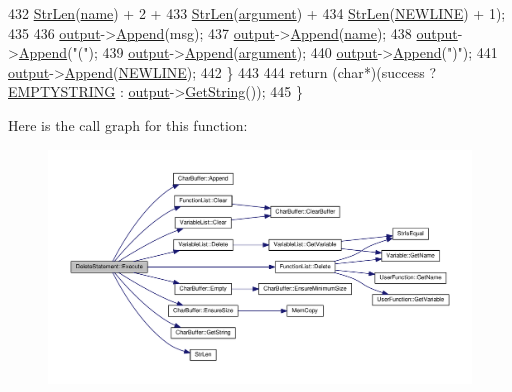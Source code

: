 \begin{DoxyCode}
432             \hyperlink{clib_8h_a67ec56eb98b49515d35005a5b3bf9a32}{StrLen}(\hyperlink{classDeleteStatement_aec9706bae02a354afec8f639e283e5b9}{name}) + 2 +
433             \hyperlink{clib_8h_a67ec56eb98b49515d35005a5b3bf9a32}{StrLen}(\hyperlink{classDeleteStatement_a0fe7f24dcfd05e0f7f449e19aaabee2d}{argument}) +
434             \hyperlink{clib_8h_a67ec56eb98b49515d35005a5b3bf9a32}{StrLen}(\hyperlink{platform_8h_a806511f4930171733227c99101dc0606}{NEWLINE}) + 1);
435 
436         \hyperlink{classSyntaxNode_a1180628cbe3fce43930cee0df5a9ce5c}{output}->\hyperlink{classCharBuffer_a045b38735f7b3007c1b98d3d7b7feafe}{Append}(msg);
437         \hyperlink{classSyntaxNode_a1180628cbe3fce43930cee0df5a9ce5c}{output}->\hyperlink{classCharBuffer_a045b38735f7b3007c1b98d3d7b7feafe}{Append}(\hyperlink{classDeleteStatement_aec9706bae02a354afec8f639e283e5b9}{name});
438         \hyperlink{classSyntaxNode_a1180628cbe3fce43930cee0df5a9ce5c}{output}->\hyperlink{classCharBuffer_a045b38735f7b3007c1b98d3d7b7feafe}{Append}(\textcolor{stringliteral}{"("});
439         \hyperlink{classSyntaxNode_a1180628cbe3fce43930cee0df5a9ce5c}{output}->\hyperlink{classCharBuffer_a045b38735f7b3007c1b98d3d7b7feafe}{Append}(\hyperlink{classDeleteStatement_a0fe7f24dcfd05e0f7f449e19aaabee2d}{argument});
440         \hyperlink{classSyntaxNode_a1180628cbe3fce43930cee0df5a9ce5c}{output}->\hyperlink{classCharBuffer_a045b38735f7b3007c1b98d3d7b7feafe}{Append}(\textcolor{stringliteral}{")"});
441         \hyperlink{classSyntaxNode_a1180628cbe3fce43930cee0df5a9ce5c}{output}->\hyperlink{classCharBuffer_a045b38735f7b3007c1b98d3d7b7feafe}{Append}(\hyperlink{platform_8h_a806511f4930171733227c99101dc0606}{NEWLINE});
442     \}
443 
444     \textcolor{keywordflow}{return} (\textcolor{keywordtype}{char}*)(success ? \hyperlink{platform_8h_a79ff1b9ff232b38c8b5600659e6bc7c2}{EMPTYSTRING} : \hyperlink{classSyntaxNode_a1180628cbe3fce43930cee0df5a9ce5c}{output}->\hyperlink{classCharBuffer_a7dfd3feaaf80f318ba44efe15b1ec44b}{GetString}());
445 \}
\end{DoxyCode}


Here is the call graph for this function\+:\nopagebreak
\begin{figure}[H]
\begin{center}
\leavevmode
\includegraphics[width=350pt]{classDeleteStatement_a709e8696c9ca4be32679e6a72b82de86_cgraph}
\end{center}
\end{figure}




